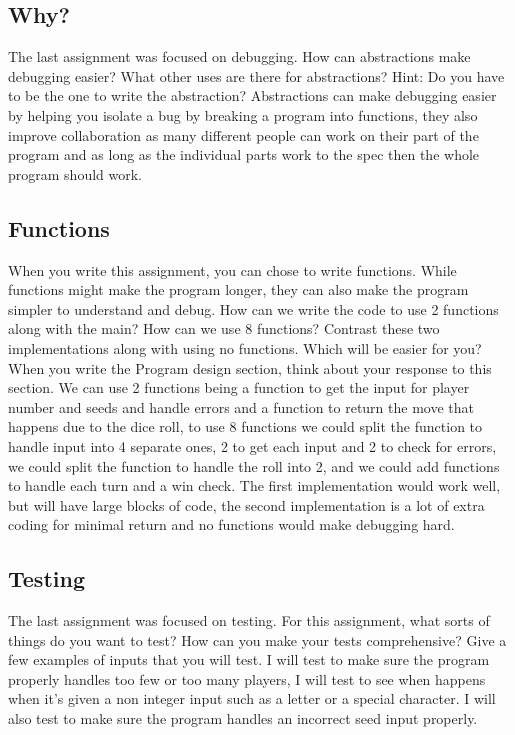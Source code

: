 \documentclass{article}
\begin{document}
\subsection{Why?}

The last assignment was focused on debugging. How can abstractions make debugging easier?
What other uses are there for abstractions? Hint: Do you have to be the one to write the abstraction?
Abstractions can make debugging easier by helping you isolate a bug by breaking a program into functions, they also improve collaboration as many different people can work on their part of the program and as long as the individual parts work to the spec then the whole program should work.

\subsection{Functions}

When you write this assignment, you can chose to write functions. While functions might make the program longer, they can also make the program simpler to understand and debug. 
How can we write the code to use 2 functions along with the main? How can we use 8 functions? Contrast these two implementations along with using no functions. Which will be easier for you?
When you write the Program design section, think about your response to this section. 
We can use 2 functions being a function to get the input for player number and seeds and handle errors and a function to return the move that happens due to the dice roll, to use 8 functions we could split the function to handle input into 4 separate ones, 2 to get each input and 2 to check for errors, we could split the function to handle the roll into 2, and we could add functions to handle each turn and a win check. The first implementation would work well, but will have large blocks of code, the second implementation is a lot of extra coding for minimal return and no functions would make debugging hard.

\subsection{Testing}

The last assignment was focused on testing. For this assignment, what sorts of things do you want to test? How can you make your tests comprehensive?
Give a few examples of inputs that you will test.
I will test to make sure the program properly handles too few or too many players, I will test to see when happens when it's given a non integer input such as a letter or a special character. I will also test to make sure the program handles an incorrect seed input properly.
\end{document}
